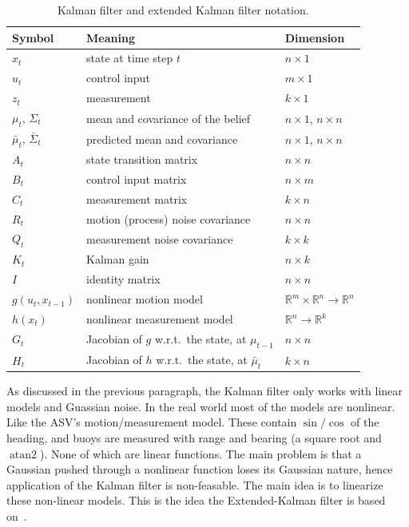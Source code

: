 \begin{table}[htbp]
  \centering
  \caption{Kalman filter and extended Kalman filter notation.}
  \label{tab:kf-notation}
  \begin{tabular}{@{}lll@{}}
    \toprule
    Symbol & Meaning & Dimension \\
    \midrule
    $x_t$ & state at time step $t$ & $n \times 1$ \\
    $u_t$ & control input & $m \times 1$ \\
    $z_t$ & measurement & $k \times 1$ \\
    \midrule
    $\mu_t$, $\Sigma_t$ & mean and covariance of the belief & $n \times 1$, $n \times n$ \\
    $\bar{\mu}_t$, $\bar{\Sigma}_t$ & predicted mean and covariance & $n \times 1$, $n \times n$ \\
    \midrule
    $A_t$ & state transition matrix & $n \times n$ \\
    $B_t$ & control input matrix & $n \times m$ \\
    $C_t$ & measurement matrix & $k \times n$ \\
    $R_t$ & motion (process) noise covariance & $n \times n$ \\
    $Q_t$ & measurement noise covariance & $k \times k$ \\
    $K_t$ & Kalman gain & $n \times k$ \\
    $I$ & identity matrix & $n \times n$ \\
    \midrule
    $g(u_t, x_{t-1})$ & nonlinear motion model & $\mathbb{R}^m \times \mathbb{R}^n \to \mathbb{R}^n$ \\
    $h(x_t)$ & nonlinear measurement model & $\mathbb{R}^n \to \mathbb{R}^k$ \\
    $G_t$ & Jacobian of $g$ w.r.t.\ the state, at $\mu_{t-1}$ & $n \times n$ \\
    $H_t$ & Jacobian of $h$ w.r.t.\ the state, at $\bar{\mu}_t$ & $k \times n$ \\
    \bottomrule
  \end{tabular}
\end{table}

As discussed in the previous paragraph, the Kalman filter
only works with linear models and Guassian noise.
In the real world most of the models are nonlinear.
Like the ASV's motion/measurement model. These contain $\sin/\cos$ of the heading,
and buoys are measured with range and bearing (a square root and $\operatorname{atan2}$).
None of which are linear functions.
The main problem is that a Gaussian pushed through a nonlinear function loses
its Gaussian nature, hence application of the Kalman filter is non-feasable.
The main idea is to linearize these non-linear models. This is the idea the
Extended-Kalman filter is based on~\citep[ch.~3]{thrun2005probabilistic}.

